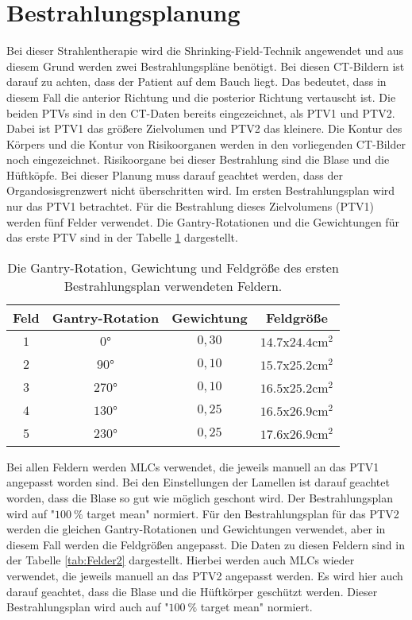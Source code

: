 \section{Bestrahlungsplanung}
\label{sec:Bestrahlungsplanung}
Bei dieser Strahlentherapie wird die Shrinking-Field-Technik angewendet und aus diesem Grund werden zwei Bestrahlungspläne benötigt.
Bei diesen CT-Bildern ist darauf zu achten, dass der Patient auf dem Bauch liegt. Das bedeutet, dass in diesem
Fall die anterior Richtung und die posterior Richtung vertauscht ist.
Die beiden PTVs sind in den CT-Daten bereits eingezeichnet, als PTV1 und PTV2. Dabei ist PTV1 das größere Zielvolumen und PTV2 das kleinere.
Die Kontur des Körpers und die Kontur von Risikoorganen werden in den
vorliegenden CT-Bilder noch eingezeichnet. Risikoorgane bei dieser Bestrahlung sind die Blase und die Hüftköpfe. Bei dieser Planung muss darauf geachtet
werden, dass der Organdosisgrenzwert nicht überschritten wird. Im ersten Bestrahlungsplan wird nur das PTV1 betrachtet.
Für die Bestrahlung dieses Zielvolumens (PTV1) werden fünf Felder verwendet.
Die Gantry-Rotationen und die Gewichtungen für das erste PTV sind in der Tabelle \ref{tab:Felder1} dargestellt.

\begin{table}
	\centering
	\caption{Die Gantry-Rotation, Gewichtung und Feldgröße des ersten Bestrahlungsplan verwendeten Feldern.}
	\label{tab:Felder1}
	\begin{tabular}{c c c c}
		\toprule
		Feld & Gantry-Rotation & Gewichtung & Feldgröße\\
		\midrule
		$1$ & $0°$   & $0,30$ & $\num{14.7}$x$\num{24.4} \si{\centi\meter\squared}$ \\
		$2$ & $90°$  & $0,10$ & $\num{15.7}$x$\num{25.2} \si{\centi\meter\squared}$ \\
		$3$ & $270°$ & $0,10$ & $\num{16.5}$x$\num{25.2} \si{\centi\meter\squared}$ \\
		$4$ & $130°$ & $0,25$ & $\num{16.5}$x$\num{26.9} \si{\centi\meter\squared}$ \\
		$5$ & $230°$ & $0,25$ & $\num{17.6}$x$\num{26.9} \si{\centi\meter\squared}$ \\
		\bottomrule
	\end{tabular}
\end{table}

Bei allen Feldern werden MLCs verwendet, die jeweils manuell an das PTV1 angepasst worden sind.
Bei den Einstellungen der Lamellen ist darauf geachtet worden, dass die Blase so gut wie möglich geschont wird.
Der Bestrahlungsplan wird auf "$\SI{100}{\percent}$ target mean"  normiert.
Für den Bestrahlungsplan für das PTV2 werden die gleichen Gantry-Rotationen und Gewichtungen verwendet, aber in diesem Fall werden die Feldgrößen angepasst.
Die Daten zu diesen Feldern sind in der Tabelle \ref{tab:Felder2} dargestellt.
Hierbei werden auch MLCs wieder verwendet, die jeweils manuell an das PTV2 angepasst werden.
Es wird hier auch darauf geachtet, dass die Blase und die Hüftkörper geschützt werden.
Dieser Bestrahlungsplan wird auch auf "$\SI{100}{\percent}$ target mean" normiert.

